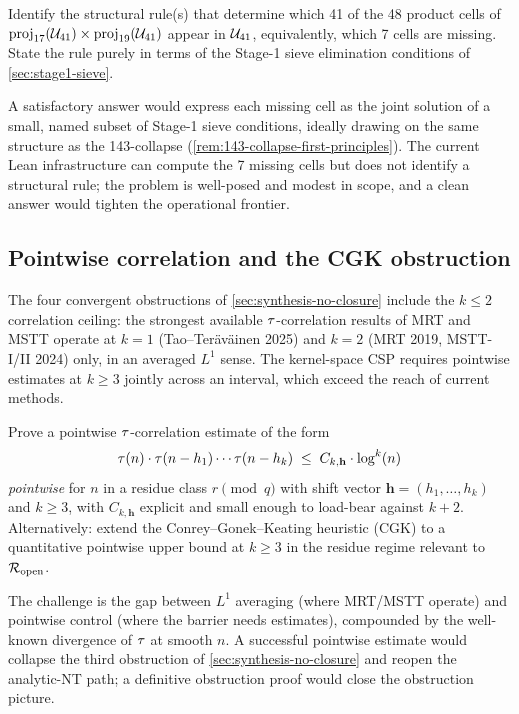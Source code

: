 \begin{problem}
\label{prob:classify-U}
Identify the structural rule(s) that determine which 41 of the 48
product cells of $\mathrm{proj}_{17}(\mathcal{U}_{41}) \times
\mathrm{proj}_{19}(\mathcal{U}_{41})$ appear in $\mathcal{U}_{41}$, equivalently, which
7 cells are missing. State the rule purely in terms of the
Stage-1 sieve elimination conditions of
\cref{sec:stage1-sieve}.
\end{problem}

A satisfactory answer would express each missing cell as the joint
solution of a small, named subset of Stage-1 sieve conditions,
ideally drawing on the same structure as the 143-collapse
(\cref{rem:143-collapse-first-principles}). The current Lean
infrastructure can compute the 7 missing cells but does not
identify a structural rule; the problem is well-posed and modest in
scope, and a clean answer would tighten the operational frontier.

\subsection{Pointwise correlation and the CGK obstruction}
\label{sec:open-pointwise-correlation}

The four convergent obstructions of
\cref{sec:synthesis-no-closure} include the $k \le 2$
correlation ceiling: the strongest available $\tau$-correlation
results of MRT and MSTT operate at $k = 1$ (Tao--Ter\"av\"ainen
2025) and $k = 2$ (MRT 2019, MSTT-I/II 2024) only, in an averaged
$L^1$ sense. The kernel-space CSP requires pointwise estimates at
$k \ge 3$ jointly across an interval, which exceed the reach of
current methods.

\begin{problem}
\label{prob:pointwise-correlation}
Prove a pointwise $\tau$-correlation estimate of the form
\[
\tau(n) \cdot \tau(n - h_1) \cdots \tau(n - h_k)
\;\le\; C_{k, \mathbf{h}} \cdot \log^k(n)
\]
\emph{pointwise} for $n$ in a residue class $r \pmod q$ with shift
vector $\mathbf{h} = (h_1, \ldots, h_k)$ and $k \ge 3$, with
$C_{k, \mathbf{h}}$ explicit and small enough to load-bear against
$k + 2$. Alternatively: extend the Conrey--Gonek--Keating
heuristic (CGK) to a quantitative pointwise upper bound at $k \ge
3$ in the residue regime relevant to $\mathcal{R}_{\mathrm{open}}$.
\end{problem}

The challenge is the gap between $L^1$ averaging
(where MRT/MSTT operate) and pointwise control (where the barrier
needs estimates), compounded by the well-known divergence of
$\tau$ at smooth $n$. A successful pointwise estimate would
collapse the third obstruction of \cref{sec:synthesis-no-closure}
and reopen the analytic-NT path; a definitive obstruction proof
would close the obstruction picture.

